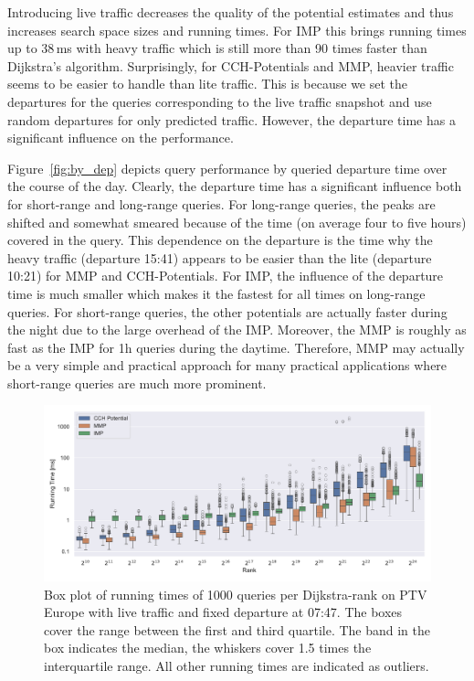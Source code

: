 \documentclass[a4paper,UKenglish,cleveref, autoref, thm-restate,anonymous]{lipics-v2021}
\begin{document}
Introducing live traffic decreases the quality of the potential estimates and thus increases search space sizes and running times.
For IMP this brings running times up to 38\,ms with heavy traffic which is still more than 90 times faster than Dijkstra's algorithm.
Surprisingly, for CCH-Potentials and MMP, heavier traffic seems to be easier to handle than lite traffic.
This is because we set the departures for the queries corresponding to the live traffic snapshot and use random departures for only predicted traffic.
However, the departure time has a significant influence on the performance.

Figure~\ref{fig:by_dep} depicts query performance by queried departure time over the course of the day.
Clearly, the departure time has a significant influence both for short-range and long-range queries.
For long-range queries, the peaks are shifted and somewhat smeared because of the time (on average four to five hours) covered in the query.
This dependence on the departure is the time why the heavy traffic (departure 15:41) appears to be easier than the lite (departure 10:21) for MMP and CCH-Potentials.
For IMP, the influence of the departure time is much smaller which makes it the fastest for all times on long-range queries.
For short-range queries, the other potentials are actually faster during the night due to the large overhead of the IMP.
Moreover, the MMP is roughly as fast as the IMP for 1h queries during the daytime.
Therefore, MMP may actually be a very simple and practical approach for many practical applications where short-range queries are much more prominent.

\begin{figure}[tbh]
\centering
\includegraphics[width=\linewidth]{fig/ranks.pdf}
\caption{
Box plot of running times of 1000 queries per Dijkstra-rank on PTV Europe with live traffic and fixed departure at 07:47.
The boxes cover the range between the first and third quartile.
The band in the box indicates the median, the whiskers cover 1.5 times the interquartile range.
All other running times are indicated as outliers.
}\label{fig:ranks}
\end{figure}
\end{document}
